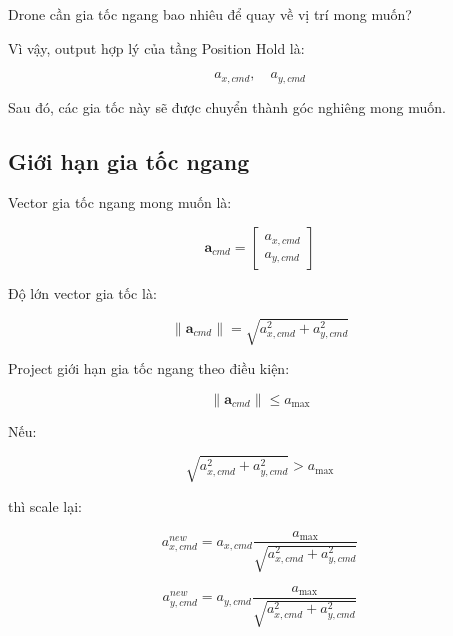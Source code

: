 \begin{center}
    Drone cần gia tốc ngang bao nhiêu để quay về vị trí mong muốn?
\end{center}

Vì vậy, output hợp lý của tầng Position Hold là:

\begin{equation}
    a_{x,cmd},\quad a_{y,cmd}
\end{equation}

Sau đó, các gia tốc này sẽ được chuyển thành góc nghiêng mong muốn.

\subsection{Giới hạn gia tốc ngang}

Vector gia tốc ngang mong muốn là:

\begin{equation}
    \mathbf{a}_{cmd}
    =
    \begin{bmatrix}
        a_{x,cmd} \\
        a_{y,cmd}
    \end{bmatrix}
\end{equation}

Độ lớn vector gia tốc là:

\begin{equation}
    \|\mathbf{a}_{cmd}\|
    =
    \sqrt{a_{x,cmd}^{2}+a_{y,cmd}^{2}}
\end{equation}

Project giới hạn gia tốc ngang theo điều kiện:

\begin{equation}
    \|\mathbf{a}_{cmd}\| \leq a_{\max}
\end{equation}

Nếu:

\begin{equation}
    \sqrt{a_{x,cmd}^{2}+a_{y,cmd}^{2}} > a_{\max}
\end{equation}

thì scale lại:

\begin{equation}
    a_{x,cmd}^{new}
    =
    a_{x,cmd}
    \frac{a_{\max}}
    {\sqrt{a_{x,cmd}^{2}+a_{y,cmd}^{2}}}
\end{equation}

\begin{equation}
    a_{y,cmd}^{new}
    =
    a_{y,cmd}
    \frac{a_{\max}}
    {\sqrt{a_{x,cmd}^{2}+a_{y,cmd}^{2}}}
\end{equation}

